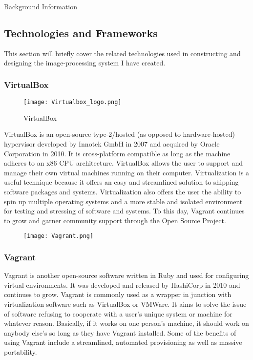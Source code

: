 \documentclass[a4paper,12pt]{article}
\begin{document}
\begin{section}{Background Information}
\newpage
\subsection{Technologies and Frameworks}

This section will briefly cover the related technologies used in constructing and designing the image-processing system I have created.

\singlespacing

\subsubsection{VirtualBox}


\begin{wrapfigure}{L}{0.5\textwidth}
\centering
\texttt{[image: Virtualbox\_logo.png]}
\caption{VirtualBox}
\end{wrapfigure}


VirtualBox is an open-source type-2/hosted (as opposed to hardware-hosted) hypervisor developed by Innotek GmbH in 2007 and acquired by Oracle Corporation in 2010. 
It is cross-platform compatible as long as the machine adheres to an x86 CPU architecture. VirtualBox allows the user to support and manage their own virtual machines running on their computer. Virtualization is a useful technique because it offers an easy and streamlined solution to shipping software packages and systems. Virtualization also offers the user the ability to spin up multiple operating systems and a more stable and isolated environment for testing and stressing of software and systems. To this day, Vagrant continues to grow and garner community support through the Open Source Project. 

\begin{wrapfigure}{R}{0.2\textwidth}
\begin{center}
\texttt{[image: Vagrant.png]}
\end{center}
\end{wrapfigure}

\subsubsection{Vagrant}

Vagrant is another open-source software written in Ruby and used for configuring virtual environments. It was developed and released by HashiCorp in 2010 and continues to grow. Vagrant is commonly used as a wrapper in junction with virtualization software such as VirtualBox or VMWare. It aims to solve the issue of software refusing to cooperate with a user's unique system or machine for whatever reason. Basically, if it works on one person's machine, it should work on anybody else's so long as they have Vagrant installed. Some of the benefits of using Vagrant include a streamlined, automated provisioning as well as massive portability. 


\end{section}
\end{document}

